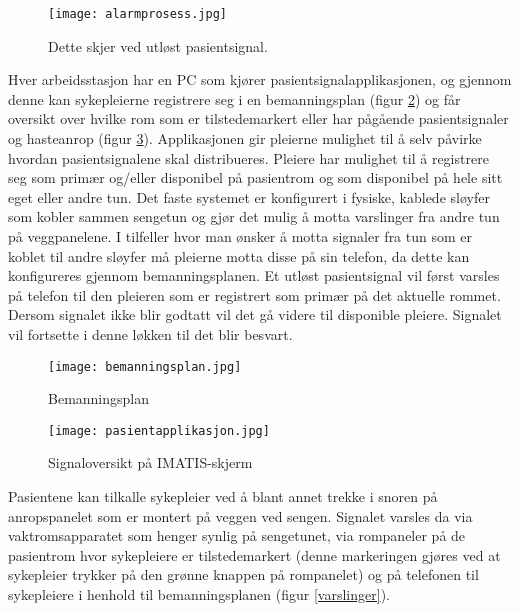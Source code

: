 \begin{figure}[H]
\centering
\texttt{[image: alarmprosess.jpg]}
\caption{Dette skjer ved utløst pasientsignal.}
\label{fig:detteskjer}
\end{figure}

\noindent
Hver arbeidsstasjon har en PC som kjører pasientsignalapplikasjonen, og gjennom denne kan sykepleierne registrere seg i en bemanningsplan (figur \ref{IMATISbemanningsplan}) og får oversikt over hvilke rom som er tilstedemarkert eller har pågående pasientsignaler og hasteanrop (figur \ref{IMATISpasientapplikasjon}). Applikasjonen gir pleierne mulighet til å selv påvirke hvordan pasientsignalene skal distribueres. Pleiere har mulighet til å registrere seg som primær og/eller disponibel på pasientrom og som disponibel på hele sitt eget eller andre tun. Det faste systemet er konfigurert i fysiske, kablede sløyfer som kobler sammen sengetun og gjør det mulig å motta varslinger fra andre tun på veggpanelene. I tilfeller hvor man ønsker å motta signaler fra tun som er koblet til andre sløyfer må pleierne motta disse på sin telefon, da dette kan konfigureres gjennom bemanningsplanen. Et utløst pasientsignal vil først varsles på telefon til den pleieren som er registrert som primær på det aktuelle rommet. Dersom signalet ikke blir godtatt vil det gå videre til disponible pleiere. Signalet vil fortsette i denne løkken til det blir besvart.

\begin{figure}[H]
\centering
\texttt{[image: bemanningsplan.jpg]}
\caption{Bemanningsplan}
\label{IMATISbemanningsplan}
\end{figure}

\begin{figure}[H]
\centering
\texttt{[image: pasientapplikasjon.jpg]}
\caption{Signaloversikt på IMATIS-skjerm}
\label{IMATISpasientapplikasjon}
\end{figure}

\noindent
Pasientene kan tilkalle sykepleier ved å blant annet trekke i snoren på anropspanelet som er montert på veggen ved sengen. Signalet varsles da via vaktromsapparatet som henger synlig på sengetunet, via rompaneler på de pasientrom hvor sykepleiere er tilstedemarkert (denne markeringen gjøres ved at sykepleier trykker på den grønne knappen på rompanelet) og på telefonen til sykepleiere i henhold til bemanningsplanen (figur \ref{varslinger}). 

